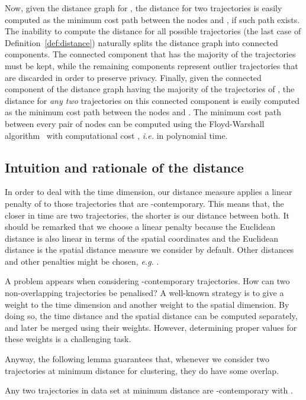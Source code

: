 Now, given the distance graph for ,
the distance  for two trajectories is easily computed as the
minimum cost path between the nodes  and , if such path exists.
The inability to compute the distance for all possible trajectories (the
last case of Definition~\ref{def:distance}) naturally splits the distance
graph into connected components. The connected component that has the majority
of the trajectories must be kept, while the remaining components represent
outlier trajectories that are discarded in order to preserve privacy. Finally,
given the connected component of the distance graph having the majority of
the trajectories of , the distance  for \emph{any
two} trajectories on this connected component is easily computed as the
minimum cost path between the nodes  and .
The minimum cost path between every pair of nodes can
be computed using the Floyd-Warshall algorithm~\cite{Floyd} with computational cost
, {\em i.e.} in polynomial time.

\subsection{Intuition and rationale of the distance}

In order to deal with the time dimension, our distance measure applies
a linear penalty of  to those trajectories that
are -contemporary. This means that, the closer in time are
two trajectories, the shorter is our distance between both.
It should be remarked that we choose a linear penalty because
the Euclidean distance is also linear in terms of the spatial coordinates
and the Euclidean distance is the spatial distance measure we
consider by default. Other distances
and other penalties might be chosen, {\em e.g.} .

A problem appears when considering -contemporary trajectories.
How can two non-overlapping trajectories be penalised?
A well-known strategy is to give a weight to the time dimension
and another weight to the spatial dimension. By doing so,
the time distance and the spatial distance can be computed separately,
and later be merged using their weights. However, determining
proper values for these weights is a challenging task.

Anyway, the following lemma guarantees that, whenever
we consider two trajectories at minimum distance
for clustering, they do have some overlap.

\begin{lemma}
Any two trajectories in data set  at minimum distance are
-contemporary with .
\end{lemma}

